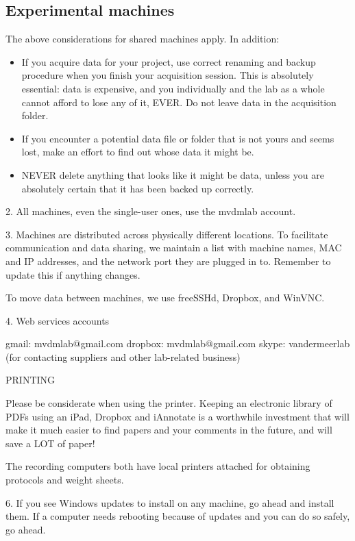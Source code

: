 \documentclass{tufte-book}
\begin{document}
\subsection{Experimental machines}

The above considerations for shared machines apply. In addition:

\begin{itemize}
\item{If you acquire data for your project, use correct renaming and backup
procedure when you finish your acquisition session. This is absolutely
essential: data is expensive, and you individually and the lab as a
whole cannot afford to lose any of it, EVER. Do not leave data in the
acquisition folder.}
\item{If you encounter a potential data file or folder that is not yours
and seems lost, make an effort to find out whose data it might be.}
\item{NEVER delete anything that looks like it might be data, unless you are absolutely certain that it has been backed up correctly.}
\end{itemize}

2. All machines, even the single-user ones, use the mvdmlab
account.

3. Machines are distributed across physically different locations. To
facilitate communication and data sharing, we maintain a list with
machine names, MAC and IP addresses, and the network port they are
plugged in to. Remember to update this if anything changes.

To move data between machines, we use freeSSHd, Dropbox, and WinVNC.

4. Web services accounts

gmail: mvdmlab@gmail.com
dropbox: mvdmlab@gmail.com
skype: vandermeerlab (for contacting suppliers and other lab-related business)

PRINTING

Please be considerate when using the printer. Keeping an electronic
library of PDFs using an iPad, Dropbox and iAnnotate is a worthwhile
investment that will make it much easier to find papers and your
comments in the future, and will save a LOT of paper!

The recording computers both have local printers attached for
obtaining protocols and weight sheets.

6. If you see Windows updates to install on any machine, go ahead and
install them. If a computer needs rebooting because of updates and you
can do so safely, go ahead.
\end{document}
